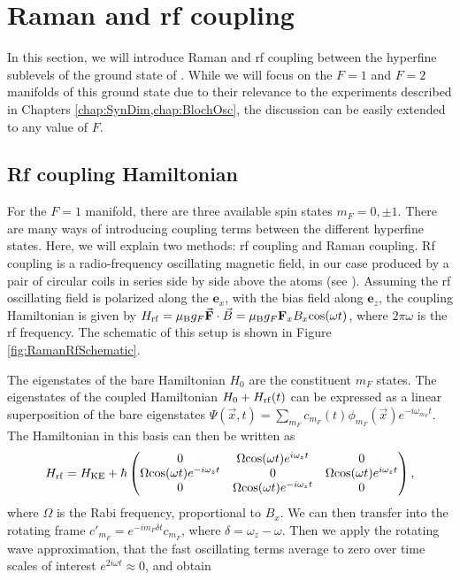 \section{Raman and rf coupling}\label{sec:RamanRf}

In this section, we will introduce Raman and rf coupling between the hyperfine sublevels of the ground state of \Rb{}. While we will focus on the $F=1$ and $F=2$ manifolds of this ground state due to their relevance to the experiments described in Chapters \ref{chap:SynDim,chap:BlochOsc}, the discussion can be easily extended to any value of $F$. 

\subsection{Rf coupling Hamiltonian}

	For the $F=1$ manifold, there are three available spin states $m_F = 0,\pm1$. There are many ways of introducing coupling terms between the different hyperfine states. Here, we will explain two methods: rf coupling and Raman coupling. Rf coupling is a radio-frequency oscillating magnetic field, in our case produced by a pair of circular coils in series side by side above the atoms (see \cite{KarinaThesis}). Assuming the rf oscillating field is polarized along the $\mathbf{e}_x$, with the bias field along $\mathbf{e}_z$, the coupling Hamiltonian is given by $H_{\rm rf} = \mu_{\rm B} g_F \vec{\mathbf{F}}\cdot{}\vec{B} = \mu_{\rm B} g_F \mathbf{F}_x B_x {\rm cos}(\omega t)$, where $2 \pi\omega$ is the rf frequency. The schematic of this setup is shown in Figure \ref{fig:RamanRfSchematic}.

The eigenstates of the bare Hamiltonian $H_0$ are the constituent $m_F$ states. The eigenstates of the coupled Hamiltonian $H_0 + H_{\rm rf}(t)$ can be expressed as a linear superposition of the bare eigenstates $\Psi(\vec{x},t)=\sum_{m_F}c_{m_F}(t)\phi_{m_F}(\vec{x})e^{-i\omega_{m_F}t}$. The Hamiltonian in this basis can then be written as\cite{LCT}
\begin{equation}
H_{\rm rf} = H_{\rm KE} + \hbar
 \begin{pmatrix} 0 & \Omega {\rm cos}(\omega t)e^{i\omega_zt}  & 0  \\ 
\Omega {\rm cos}(\omega t)e^{-i\omega_zt}  & 0 &  \Omega {\rm cos}(\omega t)e^{i\omega_zt} \\
 0 & \Omega {\rm cos}(\omega t)e^{-i\omega_zt}  & 0  \\
 \end{pmatrix} \\,
\end{equation}
where $\Omega$ is the Rabi frequency, proportional to $B_x$.
	 We can then transfer into the rotating frame $c'_{m_F} = e^{-i m_F \delta t}c_{m_F}$, where $\delta = \omega_z - \omega$. Then we apply the rotating wave approximation, that the fast oscillating terms average to zero over time scales of interest $e^{2i\omega t}\approx 0$, and obtain 

